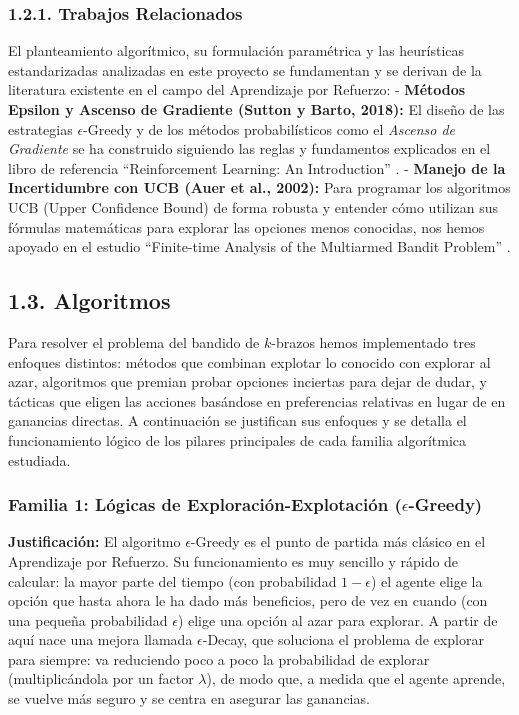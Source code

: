 \subsubsection{1.2.1. Trabajos
Relacionados}\label{trabajos-relacionados}

El planteamiento algorítmico, su formulación paramétrica y las
heurísticas estandarizadas analizadas en este proyecto se fundamentan y
se derivan de la literatura existente en el campo del Aprendizaje por
Refuerzo: - \textbf{Métodos Epsilon y Ascenso de Gradiente (Sutton y
Barto, 2018):} El diseño de las estrategias \(\epsilon\)-Greedy y de los
métodos probabilísticos como el \emph{Ascenso de Gradiente} se ha
construido siguiendo las reglas y fundamentos explicados en el libro de
referencia ``Reinforcement Learning: An Introduction''
\cite{sutton2018reinforcement}. - \textbf{Manejo de la Incertidumbre con
UCB (Auer et al., 2002):} Para programar los algoritmos UCB (Upper
Confidence Bound) de forma robusta y entender cómo utilizan sus fórmulas
matemáticas para explorar las opciones menos conocidas, nos hemos
apoyado en el estudio ``Finite-time Analysis of the Multiarmed Bandit
Problem'' \cite{auer2002finitetime}.

\subsection{1.3. Algoritmos}\label{algoritmos}

Para resolver el problema del bandido de \(k\)-brazos hemos implementado
tres enfoques distintos: métodos que combinan explotar lo conocido con
explorar al azar, algoritmos que premian probar opciones inciertas para
dejar de dudar, y tácticas que eligen las acciones basándose en
preferencias relativas en lugar de en ganancias directas. A continuación
se justifican sus enfoques y se detalla el funcionamiento lógico de los
pilares principales de cada familia algorítmica estudiada.

\subsubsection{\texorpdfstring{Familia 1: Lógicas de
Exploración-Explotación
(\(\epsilon\)-Greedy)}{Familia 1: Lógicas de Exploración-Explotación (\textbackslash epsilon-Greedy)}}\label{familia-1-luxf3gicas-de-exploraciuxf3n-explotaciuxf3n-epsilon-greedy}

\textbf{Justificación:} El algoritmo \(\epsilon\)-Greedy es el punto de
partida más clásico en el Aprendizaje por Refuerzo. Su funcionamiento es
muy sencillo y rápido de calcular: la mayor parte del tiempo (con
probabilidad \(1-\epsilon\)) el agente elige la opción que hasta ahora
le ha dado más beneficios, pero de vez en cuando (con una pequeña
probabilidad \(\epsilon\)) elige una opción al azar para explorar. A
partir de aquí nace una mejora llamada \(\epsilon\)-Decay, que soluciona
el problema de explorar para siempre: va reduciendo poco a poco la
probabilidad de explorar (multiplicándola por un factor \(\lambda\)), de
modo que, a medida que el agente aprende, se vuelve más seguro y se
centra en asegurar las ganancias.

